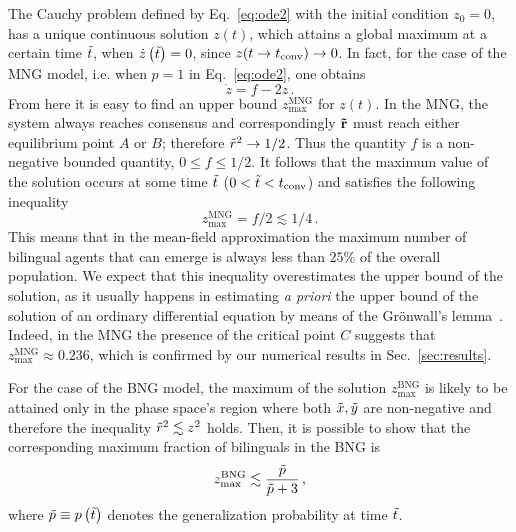 \documentclass[review]{elsarticle}
\newcommand{\zmax}{z_\mathrm{max}}
\newcommand{\tx}{\Tilde{x}}
\newcommand{\ty}{\Tilde{y}}
\newcommand{\tr}{\Tilde{r}}
\newcommand{\tp}{\Tilde{p}}
\newcommand{\Tt}{\Tilde{t}}
\newcommand{\+}{\! + \!}
\begin{document}
The Cauchy problem defined by Eq.~\eqref{eq:ode2} with the initial condition $z_0 =0$, has a unique continuous solution $z(t)$, which  attains a global maximum at a certain time  $\Tt$, when $\dot{z}\left(\Tt\right) =0$, since  $z(t\to t_{\rm conv}) \to 0$.
In fact, for the case of the MNG model, i.e. when $p = 1$ in Eq.~\eqref{eq:ode2}, one obtains
%
\begin{equation}\label{eq:ode3}
 \dot{z} =   f - 2 z    \, .
\end{equation}
%
From here it is easy to find an upper bound $\zmax^\mathrm{MNG}$ for $z(t)$.
In the MNG, the system always reaches consensus and correspondingly $\mathbf{\tr}$ must reach either equilibrium point $A$ or $B$; therefore $ \tr^{2} \to 1/2$.
Thus the quantity $f$ is a non-negative bounded quantity, $0 \le f \le 1/2$. 
It follows that the maximum value of the solution occurs at some time $\Tt$  ($ 0< \Tt <t_{\rm conv} $) and satisfies the following inequality
%
\begin{equation}\label{eq:inequality}
    \zmax^\mathrm{MNG} = f/2 \lesssim 1/4  \, .
\end{equation}
%
This means that in the mean-field approximation the maximum number of bilingual agents that can emerge is always less than  $25\%$ of the overall population. 
We expect that this inequality overestimates the upper bound of the solution, as it usually happens in estimating \emph{a priori} the upper bound of the solution of an ordinary differential equation by means of the  Gr{\"o}nwall's lemma~\cite{Gronwall-1919a}. 
Indeed, in the MNG the presence of the critical point $C$ suggests that $\zmax^\mathrm{MNG}  \approx 0.236$, which is confirmed by our numerical results in Sec.~\ref{sec:results}.


For the case of the BNG model, the maximum of the solution $\zmax^\mathrm{BNG}$ is likely to be attained only in the phase space's region where  both  $\tx, \ty $  are non-negative and therefore the inequality $\tr^{2} \lesssim z^{2} $ holds.
Then, it is possible to show that the corresponding maximum fraction of bilinguals in the BNG is
%
\begin{equation}
\label{eq:inequality1}
    \zmax^\mathrm{BNG} \lesssim \frac{\tp}{\tp + 3}  \, ,
\end{equation}
%
where $\tp \equiv p\left( \Tt\right)$ denotes the generalization probability  at time $\Tt$.  
\end{document}
